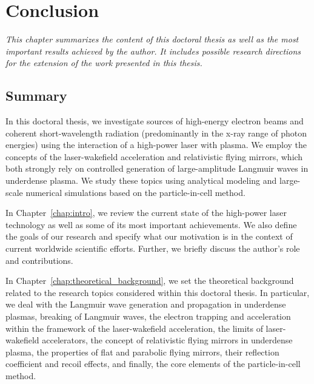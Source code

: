 \documentclass[10pt, a4paper, twoside, openright]{report}
\begin{document}


\chapter{Conclusion\label{chap:conclusion}}
%

\noindent \textsl{This chapter summarizes the content of this doctoral thesis as well as the most important results achieved by the author. It includes possible research directions for the extension of the work presented in this thesis.}

\section{Summary}

In this doctoral thesis, we investigate sources of high-energy electron beams and coherent short-wavelength radiation (predominantly in the x-ray range of photon energies) using the interaction of a high-power laser with plasma. We employ the concepts of the laser-wakefield acceleration and relativistic flying mirrors, which both strongly rely on controlled generation of large-amplitude Langmuir waves in underdense plasma. We study these topics using analytical modeling and large-scale numerical simulations based on the particle-in-cell method.

In Chapter~\ref{chap:intro}, we review the current state of the high-power laser technology as well as some of its most important achievements. We also define the goals of our research and specify what our motivation is in the context of current worldwide scientific efforts. Further, we briefly discuss the author's role and contributions. 

In Chapter~\ref{chap:theoretical_background}, we set the theoretical background related to the research topics considered within this doctoral thesis. In particular, we deal with the Langmuir wave generation and propagation in underdense plasmas, breaking of Langmuir waves, the electron trapping and acceleration within the framework of the laser-wakefield acceleration, the limits of laser-wakefield accelerators, the concept of relativistic flying mirrors in underdense plasma, the properties of flat and parabolic flying mirrors, their reflection coefficient and recoil effects, and finally, the core elements of the particle-in-cell method.
\end{document}

